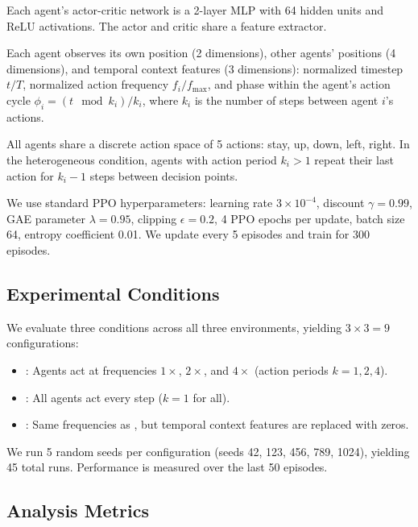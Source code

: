  Each agent's actor-critic network is a 2-layer MLP with 64 hidden units and ReLU activations. The actor and critic share a feature extractor.

 Each agent observes its own position (2 dimensions), other agents' positions (4 dimensions), and temporal context features (3 dimensions): normalized timestep $t / T$, normalized action frequency $f_i / f_{\max}$, and phase within the agent's action cycle $\phi_i = (t \mod k_i) / k_i$, where $k_i$ is the number of steps between agent $i$'s actions.

 All agents share a discrete action space of 5 actions: stay, up, down, left, right. In the heterogeneous condition, agents with action period $k_i > 1$ repeat their last action for $k_i - 1$ steps between decision points.

 We use standard PPO hyperparameters: learning rate $3 \times 10^{-4}$, discount $\gamma = 0.99$, GAE parameter $\lambda = 0.95$, clipping $\epsilon = 0.2$, 4 PPO epochs per update, batch size 64, entropy coefficient 0.01. We update every 5 episodes and train for 300 episodes.

\subsection{Experimental Conditions}
\label{sec:conditions}

We evaluate three conditions across all three environments, yielding $3 \times 3 = 9$ configurations:

\begin{itemize}[leftmargin=*,itemsep=0pt,topsep=0pt]
    \item \textbf{\hetero}: Agents act at frequencies $1\times$, $2\times$, and $4\times$ (action periods $k = 1, 2, 4$).
    \item \textbf{\homo}: All agents act every step ($k = 1$ for all).
    \item \textbf{\ablation}: Same frequencies as \hetero, but temporal context features are replaced with zeros.
\end{itemize}

We run 5 random seeds per configuration (seeds 42, 123, 456, 789, 1024), yielding 45 total runs. Performance is measured over the last 50 episodes.

\subsection{Analysis Metrics}
\label{sec:metrics}

